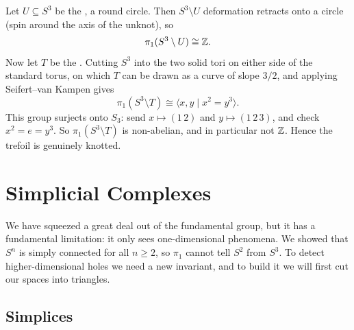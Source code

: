 \documentclass[a4paper]{scrartcl}
\newcommand{\genby}[1]{\langle #1 \rangle}
\begin{document}
\begin{example}
	Let $U \subseteq S^3$ be the , a round circle. Then $S^3 \setminus U$ deformation retracts onto a circle (spin around the axis of the unknot), so
	$$
	\pi_1(S^3\setminus U) \cong \mathbb{Z}.
	$$
	Now let $T$ be the . Cutting $S^3$ into the two solid tori on either side of the standard torus, on which $T$ can be drawn as a curve of slope $3/2$, and applying Seifert--van Kampen gives
	$$
	\pi_1(S^3 \setminus T) \cong \genby{x, y \mid x^2 = y^3}.
	$$
	This group surjects onto $S_3$: send $x \mapsto (1\,2)$ and $y \mapsto (1\,2\,3)$, and check $x^2 = e = y^3$. So $\pi_1(S^3\setminus T)$ is non-abelian, and in particular not $\mathbb{Z}$. Hence the trefoil is genuinely knotted.
\end{example}

\begin{center}
\end{center}

\section{Simplicial Complexes} \label{sec:simplicial}

We have squeezed a great deal out of the fundamental group, but it has a fundamental
limitation: it only sees one-dimensional phenomena. We showed that $S^n$ is simply
connected for all $n \geq 2$, so $\pi_1$ cannot tell $S^2$ from $S^3$. To detect
higher-dimensional holes we need a new invariant, and to build it we will first cut our
spaces into triangles.

\subsection{Simplices}
\end{document}
